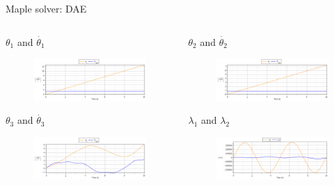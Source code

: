\documentclass{beamer}              %
\begin{document}
	\begin{frame}{Maple solver: DAE}		
		\begin{columns}
			\begin{column}{0.5\textwidth}
				\begin{block}{\small \centering $\theta_1$ and $\dot{\theta_1}$}
					\begin{figure}
						\includegraphics[width=150pt]{grafici/theta1_pos_vel.png}
					\end{figure}
				\end{block}
				\begin{block}{\small \centering $\theta_3$ and $\dot{\theta_3}$}
					\begin{figure}
						\includegraphics[width=150pt]{grafici/theta3_pos_vel.png}
					\end{figure}
				\end{block}
			\end{column}
			\begin{column}{0.5\textwidth}
				\begin{block}{\small \centering $\theta_2$ and $\dot{\theta_2}$}
					\begin{figure}
						\includegraphics[width=150pt]{grafici/theta2_pos_vel.png}
					\end{figure}
				\end{block}
				\begin{block}{\centering \small $\lambda_1$ and $\lambda_2$}
					\begin{figure}
						\includegraphics[width=150pt]{grafici/lambda1and2.png}
					\end{figure}
				\end{block}
			\end{column}
		\end{columns}
	\end{frame}
\end{document}
